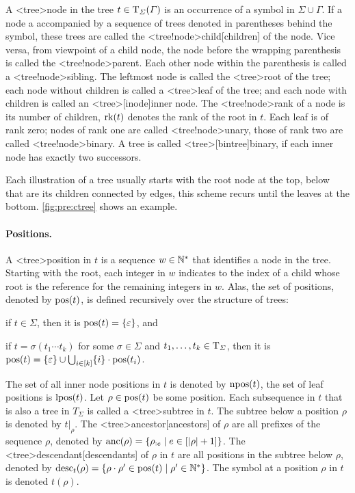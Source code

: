 \documentclass[../document.tex]{subfiles}
\begin{document}
    A <tree>{node} in the tree \(t \in \operatorname{T}_\varSigma(\varGamma)\) is an occurrence of a symbol in \(\varSigma \cup \varGamma\).
    If a node a accompanied by a sequence of trees denoted in parentheses behind the symbol, these trees are called the <tree!node>{child}[children] of the node.
    Vice versa, from viewpoint of a child node, the node before the wrapping parenthesis is called the <tree!node>{parent}.
    Each other node within the parenthesis is called a <tree!node>{sibling}.
    The leftmost node is called the <tree>{root} of the tree; each node without children is called a <tree>{leaf} of the tree; and each node with children is called an <tree>[inode]{inner node}.
    The <tree!node>{rank} of a node is its number of children, \(\operatorname{rk}(t)\) denotes the rank of the root in \(t\).
    Each leaf is of rank zero; nodes of rank one are called <tree!node>{unary}, those of rank two are called <tree!node>{binary}.
    A tree is called <tree>[bintree]{binary}, if each inner node has exactly two successors.

    Each illustration of a tree usually starts with the root node at the top, below that are its children connected by edges, this scheme recurs until the leaves at the bottom.
    \cref{fig:pre:ctree} shows an example.

    \paragraph{Positions.}
    A <tree>{position} in \(t\) is a sequence $w \in \mathbb{N}^*$ that identifies a node in the tree.
    Starting with the root, each integer in \(w\) indicates to the index of a child whose root is the reference for the remaining integers in \(w\).
    Alas, the set of positions, denoted by \(\operatorname{pos}(t)\), is defined recursively over the structure of trees:
    \begin{inparaenum}
        \item if \(t \in \varSigma\), then it is \(\operatorname{pos}(t) = \{\varepsilon\}\), and
        \item if \(t = \sigma(t_1 \cdots t_k)\) for some \(\sigma\in \varSigma\) and \(t_1, \ldots, t_k \in \operatorname{T}_\varSigma\), then it is \(\operatorname{pos}(t) = \{\varepsilon\} \cup \bigcup_{i\in[k]} \{i\}\cdot \operatorname{pos}(t_i)\).
    \end{inparaenum}
    The set of all inner node positions in \(t\) is denoted by \(\operatorname{npos}(t)\), the set of leaf positions is \(\operatorname{lpos}(t)\).
    Let \(\rho \in \operatorname{pos}(t)\) be some position.
    Each subsequence in \(t\) that is also a tree in \(T_\varSigma\) is called a <tree>{subtree} in \(t\).
    The subtree below a position \(\rho\) is denoted by \(t|_\rho\).
    The <tree>{ancestor}[ancestors] of \(\rho\) are all prefixes of the sequence \(\rho\), denoted by \(\operatorname{anc}(\rho) = \{ \rho_{:e} \mid e \in [|\rho|+1] \}\).
    The <tree>{descendant}[descendants] of \(\rho\) in \(t\) are all positions in the subtree below \(\rho\), denoted by \(\operatorname{desc}_t(\rho) = \{ \rho \cdot \rho' \in \operatorname{pos}(t) \mid \rho' \in \mathbb{N}^* \}\).
    The symbol at a position \(\rho\) in \(t\) is denoted  \(t(\rho)\).
\end{document}

